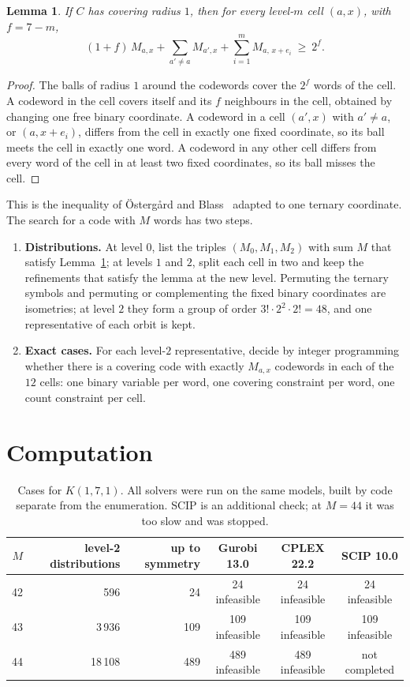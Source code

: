 \documentclass[11pt]{article}
\newtheorem{lemma}[theorem]{Lemma}
\theoremstyle{remark}
\begin{document}
\begin{lemma}\label{lem:count}
If $C$ has covering radius $1$, then for every level-$m$ cell $(a,x)$, with $f=7-m$,
\[
(1+f)\,M_{a,x}+\sum_{a'\neq a}M_{a',x}+\sum_{i=1}^{m}M_{a,\,x+e_i}\ \ge\ 2^{f}.
\]
\end{lemma}

\begin{proof}
The balls of radius $1$ around the codewords cover the $2^f$ words of the cell. A codeword in the
cell covers itself and its $f$ neighbours in the cell, obtained by changing one free binary
coordinate. A codeword in a cell $(a',x)$ with $a'\neq a$, or $(a,x+e_i)$, differs from the cell
in exactly one fixed coordinate, so its ball meets the cell in exactly one word. A codeword in
any other cell differs from every word of the cell in at least two fixed coordinates, so its ball
misses the cell.
\end{proof}

This is the inequality of Östergård and Blass~\cite{ob} adapted to one ternary coordinate. The
search for a code with $M$ words has two steps.
\begin{enumerate}
\item \textbf{Distributions.} At level $0$, list the triples $(M_0,M_1,M_2)$ with sum $M$ that
  satisfy Lemma~\ref{lem:count}; at levels $1$ and $2$, split each cell in two and keep the
  refinements that satisfy the lemma at the new level. Permuting the ternary symbols and
  permuting or complementing the fixed binary coordinates are isometries; at level $2$ they form a
  group of order $3!\cdot 2^2\cdot 2!=48$, and one representative of each orbit is kept.
\item \textbf{Exact cases.} For each level-$2$ representative, decide by integer programming
  whether there is a covering code with exactly $M_{a,x}$ codewords in each of the $12$ cells:
  one binary variable per word, one covering constraint per word, one count constraint per cell.
\end{enumerate}

\section{Computation}

\begin{table}[h]
\centering
\begin{tabular}{rrrccc}
\toprule
$M$ & level-2 distributions & up to symmetry & Gurobi 13.0 & CPLEX 22.2 & SCIP 10.0 \\
\midrule
42 & 596     & 24  & 24 infeasible  & 24 infeasible  & 24 infeasible \\
43 & 3\,936  & 109 & 109 infeasible & 109 infeasible & 109 infeasible \\
44 & 18\,108 & 489 & 489 infeasible & 489 infeasible & not completed \\
\bottomrule
\end{tabular}
\caption{Cases for $K(1,7,1)$. All solvers were run on the same models, built by code separate
from the enumeration. SCIP is an additional check; at $M=44$ it was too slow and was stopped.}
\label{tab:cases}
\end{table}
\end{document}
